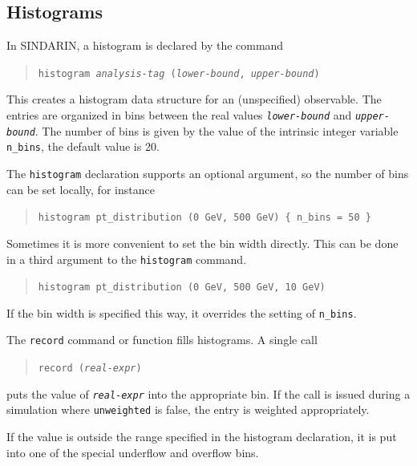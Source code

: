 \documentclass[12pt]{book}
\newcommand{\ttt}[1]{\texttt{#1}}
\begin{document}
\subsection{Histograms}
\label{sec:histogram}

In SINDARIN, a histogram is declared by the command
\begin{quote}
  \begin{footnotesize}
\ttt{histogram \emph{analysis-tag} (\emph{lower-bound}, \emph{upper-bound})}
  \end{footnotesize}
\end{quote}
This creates a histogram data structure for an (unspecified) observable.  The
entries are organized in bins between the real values \ttt{\emph{lower-bound}}
and \ttt{\emph{upper-bound}}.  The number of bins is given by the value of the
intrinsic integer variable \ttt{n\_bins}, the default value is 20.

The \ttt{histogram} declaration supports an optional argument, so the number
of bins can be set locally, for instance
\begin{quote}
  \begin{footnotesize}
\ttt{histogram pt\_distribution (0 GeV, 500 GeV) \{ n\_bins = 50 \}}
  \end{footnotesize}
\end{quote}
Sometimes it is more convenient to set the bin width directly.  This can be
done in a third argument to the \ttt{histogram} command.  
\begin{quote}
  \begin{footnotesize}
\ttt{histogram pt\_distribution (0 GeV, 500 GeV, 10 GeV)}
  \end{footnotesize}
\end{quote}
If the bin width is specified this way, it overrides the setting of
\ttt{n\_bins}. 

The \ttt{record} command or function fills histograms.  A single call
\begin{quote}
  \begin{footnotesize}
\ttt{record (\emph{real-expr})}
  \end{footnotesize}
\end{quote}
puts the value of \ttt{\emph{real-expr}} into the appropriate bin.  If
the call is issued during a simulation where \ttt{unweighted} is false, the
entry is weighted appropriately.

If the value is outside the range specified in the histogram declaration, it
is put into one of the special underflow and overflow bins.
\end{document}
